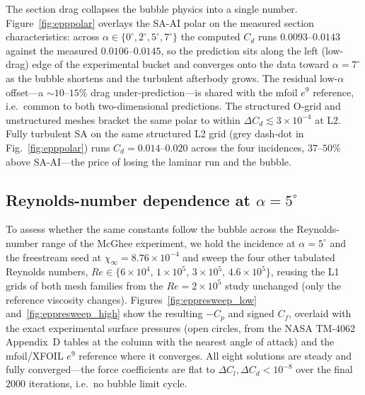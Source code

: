 \documentclass[journal]{new-aiaa}
\begin{document}
The section drag collapses the bubble physics into a single number.
Figure~\ref{fig:epppolar} overlays the SA-AI polar on the measured section
characteristics: across $\alpha\!\in\!\{0^\circ,2^\circ,5^\circ,7^\circ\}$ the
computed $C_d$ runs $0.0093$--$0.0143$ against the measured $0.0106$--$0.0145$,
so the prediction sits along the left (low-drag) edge of the experimental bucket
and converges onto the data toward $\alpha\!=\!7^\circ$ as the bubble shortens
and the turbulent afterbody grows. The residual low-$\alpha$ offset---a
$\sim\!10$--$15\%$ drag under-prediction---is shared with the mfoil $e^9$
reference, i.e.\ common to both two-dimensional predictions. The structured
O-grid and unstructured meshes bracket the same polar to within
$\Delta C_d\!\lesssim\!3\times10^{-4}$ at L2. Fully turbulent SA on the same
structured L2 grid (grey dash-dot in Fig.~\ref{fig:epppolar}) runs
$C_d\!=\!0.014$--$0.020$ across the four incidences, $37$--$50\%$ above
SA-AI---the price of losing the laminar run and the bubble.

\subsection{Reynolds-number dependence at $\alpha\!=\!5^\circ$}\label{sec:eppresweep}

To assess whether the same constants follow the bubble across the
Reynolds-number range of the McGhee experiment, we hold the incidence at
$\alpha\!=\!5^\circ$ and the freestream seed at
$\chi_\infty\!=\!8.76\!\times\!10^{-4}$ and sweep the four other tabulated
Reynolds numbers,
$Re\!\in\!\{6\!\times\!10^4,\,1\!\times\!10^5,\,3\!\times\!10^5,\,4.6\!\times\!10^5\}$,
reusing the L1 grids of both mesh families from the $Re\!=\!2\!\times\!10^5$
study unchanged (only the reference viscosity changes).
Figures~\ref{fig:eppresweep_low} and~\ref{fig:eppresweep_high} show the resulting
$-C_p$ and signed $C_f$, overlaid with the exact experimental surface pressures
(open circles, from the NASA TM-4062 Appendix~D tables at the column with the
nearest angle of attack) and the mfoil/XFOIL $e^9$ reference where it converges.
All eight solutions are steady and fully converged---the force coefficients are
flat to $\Delta C_l,\Delta C_d\!<\!10^{-8}$ over the final $2000$ iterations,
i.e.\ no bubble limit cycle.
\end{document}
